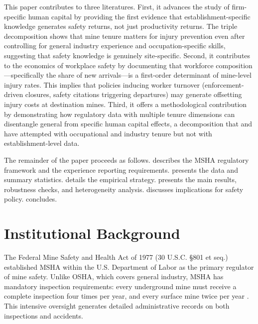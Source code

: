 \documentclass[12pt]{article}
\begin{document}
This paper contributes to three literatures. First, it advances the study of firm-specific human capital \citep{Becker1962, Topel1991, Lazear2009} by providing the first evidence that establishment-specific knowledge generates safety returns, not just productivity returns. The triple decomposition shows that mine tenure matters for injury prevention even after controlling for general industry experience and occupation-specific skills, suggesting that safety knowledge is genuinely site-specific. Second, it contributes to the economics of workplace safety \citep{Viscusi1993, Lavetti2020, Garin2023} by documenting that workforce composition---specifically the share of new arrivals---is a first-order determinant of mine-level injury rates. This implies that policies inducing worker turnover (enforcement-driven closures, safety citations triggering departures) may generate offsetting injury costs at destination mines. Third, it offers a methodological contribution by demonstrating how regulatory data with multiple tenure dimensions can disentangle general from specific human capital effects, a decomposition that \citet{Kambourov2009} and \citet{Sullivan2010} have attempted with occupational and industry tenure but not with establishment-level data.

The remainder of the paper proceeds as follows.  describes the MSHA regulatory framework and the experience reporting requirements.  presents the data and summary statistics.  details the empirical strategy.  presents the main results, robustness checks, and heterogeneity analysis.  discusses implications for safety policy.  concludes.


\section{Institutional Background}\label{sec:background}

The Federal Mine Safety and Health Act of 1977 (30 U.S.C. \S 801 et seq.) established MSHA within the U.S. Department of Labor as the primary regulator of mine safety. Unlike OSHA, which covers general industry, MSHA has mandatory inspection requirements: every underground mine must receive a complete inspection four times per year, and every surface mine twice per year \citep{MSHA2023}. This intensive oversight generates detailed administrative records on both inspections and accidents.
\end{document}
